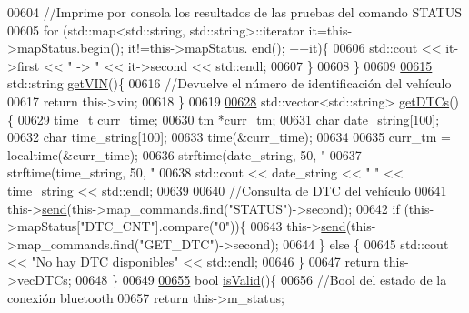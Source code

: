 \begin{DoxyCode}
{{{{{{{{{{{{{{00604         \textcolor{comment}{//Imprime por consola los resultados de las pruebas del comando STATUS}
00605         \textcolor{keywordflow}{for} (std::map<std::string, std::string>::iterator it=this->mapStatus.begin(); it!=this->mapStatus.
      end(); ++it)\{
00606             std::cout << it->first << \textcolor{stringliteral}{" -> "} << it->second << std::endl;
00607         \}
00608     \}
00609 
\hyperlink{classObd_ad88a0f25a7e3961726737915668ee13d}{00615}     std::string \hyperlink{classObd_ad88a0f25a7e3961726737915668ee13d}{getVIN}()\{
00616         \textcolor{comment}{//Devuelve el número de identificación del vehículo}
00617         \textcolor{keywordflow}{return} this->vin;
00618     \}
00619     
\hyperlink{classObd_ac57afb9228d933c6be5b2fa8e6446036}{00628}     std::vector<std::string> \hyperlink{classObd_ac57afb9228d933c6be5b2fa8e6446036}{getDTCs}()\{
00629         time\_t curr\_time;
00630         tm *curr\_tm;
00631         \textcolor{keywordtype}{char} date\_string[100];
00632         \textcolor{keywordtype}{char} time\_string[100];
00633         time(&curr\_time);
00634 
00635         curr\_tm = localtime(&curr\_time);
00636         strftime(date\_string, 50, \textcolor{stringliteral}{"%
00637         strftime(time\_string, 50, \textcolor{stringliteral}{"%
00638         std::cout << date\_string << \textcolor{stringliteral}{" "} << time\_string << std::endl;
00639 
00640         \textcolor{comment}{//Consulta de DTC del vehículo}
00641         this->\hyperlink{classObd_a453591bc9a280e8d44d82025ce8590e9}{send}(this->map\_commands.find(\textcolor{stringliteral}{"STATUS"})->second);
00642         \textcolor{keywordflow}{if} (this->mapStatus[\textcolor{stringliteral}{"DTC\_CNT"}].compare(\textcolor{stringliteral}{"0"}))\{
00643             this->\hyperlink{classObd_a453591bc9a280e8d44d82025ce8590e9}{send}(this->map\_commands.find(\textcolor{stringliteral}{"GET\_DTC"})->second);
00644         \} \textcolor{keywordflow}{else} \{
00645             std::cout << \textcolor{stringliteral}{"No hay DTC disponibles"} << std::endl;
00646         \}
00647         \textcolor{keywordflow}{return} this->vecDTCs;
00648     \}
00649 
\hyperlink{classObd_ae28b765bb787467f929eae932133d2aa}{00655}     \textcolor{keywordtype}{bool} \hyperlink{classObd_ae28b765bb787467f929eae932133d2aa}{isValid}()\{
00656         \textcolor{comment}{//Bool del estado de la conexión bluetooth}
00657         \textcolor{keywordflow}{return} this->m\_status;
}}}}}}}}}}}}}}}}
\end{DoxyCode}
